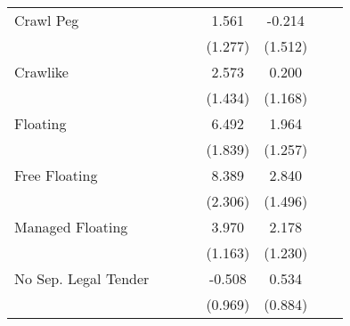 \begin{table}[H]
\begin{adjustbox}{max width=\textwidth}
\begin{tabular}{l*{7}{c}}
\addlinespace
Crawl Peg   &                     &                     &                     &       1.561         &      -0.214         &                     &                     \\
            &                     &                     &                     &     (1.277)         &     (1.512)         &                     &                     \\
\addlinespace
Crawlike    &                     &                     &                     &       2.573\sym{*}  &       0.200         &                     &                     \\
            &                     &                     &                     &     (1.434)         &     (1.168)         &                     &                     \\
\addlinespace
Floating    &                     &                     &                     &       6.492\sym{***}&       1.964         &                     &                     \\
            &                     &                     &                     &     (1.839)         &     (1.257)         &                     &                     \\
\addlinespace
Free Floating&                     &                     &                     &       8.389\sym{***}&       2.840\sym{*}  &                     &                     \\
            &                     &                     &                     &     (2.306)         &     (1.496)         &                     &                     \\
\addlinespace
Managed Floating&                     &                     &                     &       3.970\sym{***}&       2.178\sym{*}  &                     &                     \\
            &                     &                     &                     &     (1.163)         &     (1.230)         &                     &                     \\
\addlinespace
No Sep. Legal Tender&                     &                     &                     &      -0.508         &       0.534         &                     &                     \\
            &                     &                     &                     &     (0.969)         &     (0.884)         &                     &                     \\

\end{tabular}
\end{adjustbox}
\end{table}
